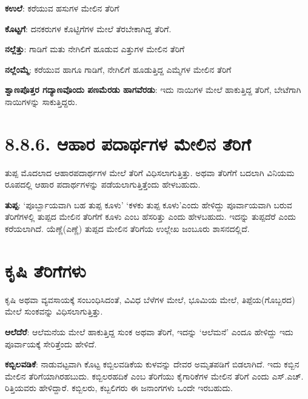 \textbf{ಕಉಲೆ}: ಕರೆಯುವ ಹಸುಗಳ ಮೇಲಿನ ತೆರಿಗೆ

\textbf{ಕೊಟ್ಟಗೆ}: ದನಕರುಗಳ ಕೊಟ್ಟಿಗೆಗಳ ಮೇಲೆ ತೆರಬೇಕಾಗಿದ್ದ ತೆರಿಗೆ.

\textbf{ನಲ್ಲೆತ್ತು}: ಗಾಡಿಗೆ ಮತು ನೇಗಿಲಿಗೆ ಹೂಡುವ ಎತ್ತುಗಳ ಮೇಲಿನ ತೆರಿಗೆ

\textbf{ನಲ್ಲೆಂಮ್ಮೆ}: ಕರೆಯುವ ಹಾಗೂ ಗಾಡಿಗೆ, ನೇಗಿಲಿಗೆ ಹೂಡುತ್ತಿದ್ದ ಎಮ್ಮೆಗಳ ಮೇಲಿನ ತೆರಿಗೆ

\textbf{ಶ್ವಾಣಪೊತ್ತರ ಗದ್ಯಾಣವೊಂದು ಪಣಮೆರಡು ಹಾಗವೆರಡು}: ಇದು ನಾಯಿಗಳ ಮೇಲೆ ಹಾಕುತ್ತಿದ್ದ ತೆರಿಗೆ, ಬೇಟೆಗಾಗಿ ನಾಯಿಗಳನ್ನು ಸಾಕುತ್ತಿದ್ದರು.


\section{8.8.6. ಆಹಾರ ಪದಾರ್ಥಗಳ ಮೇಲಿನ ತೆರಿಗೆ}

ತುಪ್ಪ ಮೊದಲಾದ ಆಹಾರಪದಾರ್ಥಗಳ ಮೇಲೆ ತೆರಿಗೆ ವಿಧಿಸಲಾಗುತ್ತಿತ್ತು. ಅಥವಾ ತೆರಿಗೆಗೆ ಬದಲಾಗಿ ವಿನಿಯಮ ರೂಪದಲ್ಲಿ ಆಹಾರ ಪದಾರ್ಥಗಳನ್ನು ಪಡೆಯಲಾಗುತ್ತಿತ್ತೆಂದು ಹೇಳಬಹುದು.

\textbf{ತುಪ್ಪ}: ‘ಪೂರ್ಬ್ಬಾಯವಾಗಿ ಬಹ ತುಪ್ಪ ಕೂಳು’ ‘ಕಳಕು ತುಪ್ಪ ಕೂಳು’ಎಂದು ಹೇಳಿದ್ದು ಪೂರ್ವಾಯವಾಗಿ ಬರುವ ತೆರಿಗೆಗಳಲ್ಲಿ ತುಪ್ಪದ ಮೇಲಿನ ತೆರಿಗೆಗೆ ಕೂಳು ಎಂಬ ಹೆಸರಿತ್ತು ಎಂದು ಹೇಳಬಹುದು. ಇದನ್ನು ತುಪ್ಪದೆರೆ ಎಂದು ಕರೆಯಲಾಗಿದೆ. ಯೆಣ್ಣೆ(ಎಣ್ಣೆ) ತುಪ್ಪದ ಮೇಲಿನ ತೆರಿಗೆಯ ಉಲ್ಲೇಖ ಜಂಬೂರು ಶಾಸನದಲ್ಲಿದೆ.


\section{ಕೃಷಿ ತೆರಿಗೆಗಳು}

ಕೃಷಿ ಅಥವಾ ವ್ಯವಸಾಯಕ್ಕೆ ಸಂಬಂಧಿಸಿದಂತೆ, ವಿವಿಧ ಬೆಳೆಗಳ ಮೇಲೆ, ಭೂಮಿಯ ಮೇಲೆ, ತಿಪ್ಪೆಯ(ಗೊಬ್ಬರದ) ಮೇಲೆ ಸುಂಕವನ್ನು ವಿಧಿಸಲಾಗುತ್ತಿತ್ತು.

\textbf{ಆಲೆದೆರೆ}: ಆಲೆಮನೆಯ ಮೇಲೆ ಹಾಕುತ್ತಿದ್ದ ಸುಂಕ ಅಥವಾ ತೆರಿಗೆ, ಇದನ್ನು ‘ಆಲೆಮನೆ’ ಎಂದೂ ಹೇಳಿದ್ದು ಇದು ಪೂರ್ವಾಯಕ್ಕೆ ಸೇರಿತ್ತೆಂದು ಹೇಳಿದೆ.

\textbf{ಕಬ್ಬಿಲವಡಿಕೆ}: ನಾಡುವಟ್ಟವಾಗಿ ಕೊಟ್ಟ ಕಬ್ಬಿಲವಡಿಕೆಯ ಕುಳವನ್ನು ದೇವರ ಅಮೃತಪಡಿಗೆ ಬಿಡಲಾಗಿದೆ. ಇದು ಕಬ್ಬಿನ ಮೇಲಿನ ತೆರಿಗೆಯಾಗಿರಹಬುದು. ಕಬ್ಬಿಲರಹದಿಕೆ ಎಂಬ ತೆರಿಗೆಯು ಕೈಗಾರಿಕೆಗಳ ಮೇಲಿನ ತೆರಿಗೆ ಎಂದು ಎಸ್​.ಎಚ್​. ರಿತ್ತಿಯವರು ಹೇಳಿದ್ದಾರೆ. ಕಬ್ಬಿಲರು, ಕಬ್ಬಲಿಗರು ಈ ಜನಾಂಗಗಳು ಒಂದೇ ಇರಬಹುದು.


